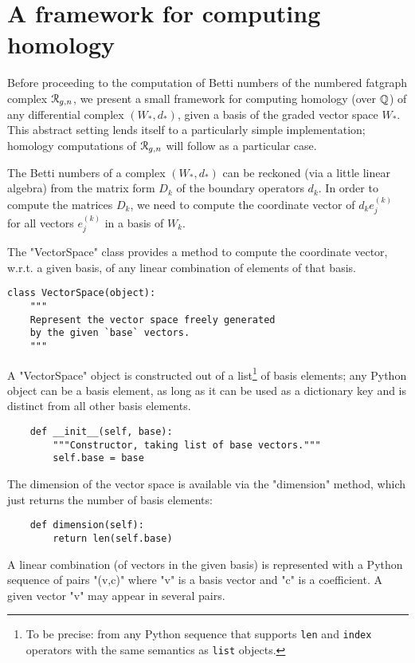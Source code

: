 \section{A framework for computing homology}
\label{sec:homology}

Before proceeding to the computation of Betti numbers of the numbered
fatgraph complex $\mathcal{R}_{g,n}$, we present a small framework for computing
homology (over $\mathbb{Q}$) of any differential complex $(W_*, d_*)$, given a
basis of the graded vector space $W_*$.  This abstract setting lends
itself to a particularly simple implementation; homology computations
of $\mathcal{R}_{g,n}$ will follow as a particular case.

The Betti numbers of a complex $(W_*, d_*)$ can be reckoned (via a
little linear algebra) from the matrix form $D_k$ of the boundary
operators $d_k$.  In order to compute the matrices $D_k$, we need to
compute the coordinate vector of $d_ke^{(k)}_j$ for all vectors
$e^{(k)}_j$ in a basis of $W_k$.

The "VectorSpace" class provides a method to compute the coordinate
vector, w.r.t. a given basis, of any linear combination of elements of
that basis.
\begin{lstlisting}
class VectorSpace(object):
    """
    Represent the vector space freely generated 
    by the given `base` vectors.
    """
\end{lstlisting}
A "VectorSpace" object is constructed out of a list\footnote{To be
  precise: from any Python sequence that supports \Verb'len' and
  \Verb'index' operators with the same semantics as \Verb'list'
  objects.} of basis elements; any Python object can be a basis
element, as long as it can be used as a dictionary key and is distinct
from all other basis elements.
\begin{lstlisting}
    def __init__(self, base):
        """Constructor, taking list of base vectors."""
        self.base = base

\end{lstlisting}
The dimension of the vector space is available via the "dimension"
method, which just returns the number of basis elements:
\begin{lstlisting}
    def dimension(self):
        return len(self.base)

\end{lstlisting}

A linear combination (of vectors in the given basis) is represented
with a Python sequence of pairs "(v,c)" where "v" is a basis vector
and "c" is a coefficient.  A given vector "v" may appear in several
pairs. 

